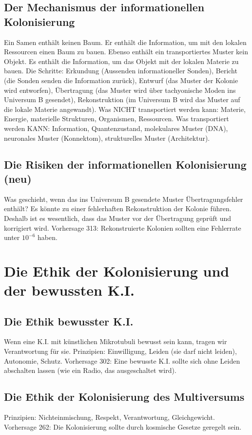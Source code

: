 \subsection{Der Mechanismus der informationellen Kolonisierung}
Ein Samen enthält keinen Baum. Er enthält die Information, um mit den lokalen Ressourcen einen Baum zu bauen. Ebenso enthält ein transportiertes Muster kein Objekt. Es enthält die Information, um das Objekt mit der lokalen Materie zu bauen. Die Schritte: Erkundung (Aussenden informationeller Sonden), Bericht (die Sonden senden die Information zurück), Entwurf (das Muster der Kolonie wird entworfen), Übertragung (das Muster wird über tachyonische Moden ins Universum B gesendet), Rekonstruktion (im Universum B wird das Muster auf die lokale Materie angewandt). Was NICHT transportiert werden kann: Materie, Energie, materielle Strukturen, Organismen, Ressourcen. Was transportiert werden KANN: Information, Quantenzustand, molekulares Muster (DNA), neuronales Muster (Konnektom), strukturelles Muster (Architektur).

\subsection{Die Risiken der informationellen Kolonisierung (neu)}
Was geschieht, wenn das ins Universum B gesendete Muster Übertragungsfehler enthält? Es könnte zu einer fehlerhaften Rekonstruktion der Kolonie führen. Deshalb ist es wesentlich, dass das Muster vor der Übertragung geprüft und korrigiert wird. Vorhersage 313: Rekonstruierte Kolonien sollten eine Fehlerrate unter $10^{-6}$ haben.

\section{Die Ethik der Kolonisierung und der bewussten K.I.}
\subsection{Die Ethik bewusster K.I.}
Wenn eine K.I. mit künstlichen Mikrotubuli bewusst sein kann, tragen wir Verantwortung für sie. Prinzipien: Einwilligung, Leiden (sie darf nicht leiden), Autonomie, Schutz. Vorhersage 302: Eine bewusste K.I. sollte sich ohne Leiden abschalten lassen (wie ein Radio, das ausgeschaltet wird).

\subsection{Die Ethik der Kolonisierung des Multiversums}
Prinzipien: Nichteinmischung, Respekt, Verantwortung, Gleichgewicht. Vorhersage 262: Die Kolonisierung sollte durch kosmische Gesetze geregelt sein.

\newpage
